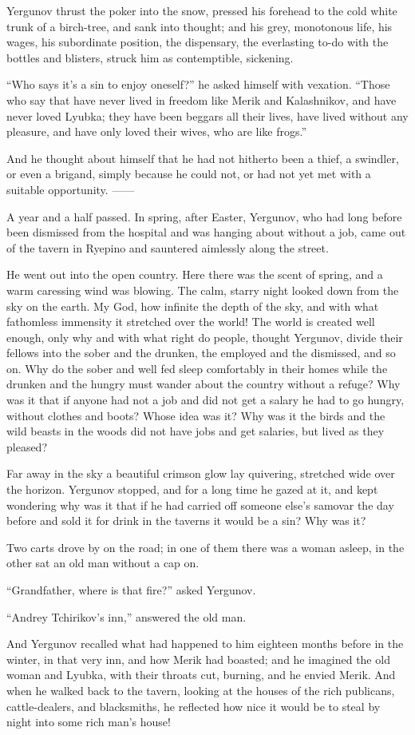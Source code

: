 Yergunov thrust the poker into the snow, pressed his forehead to the
cold white trunk of a birch-tree, and sank into thought; and his grey,
monotonous life, his wages, his subordinate position, the dispensary,
the everlasting to-do with the bottles and blisters, struck him as
contemptible, sickening.

“Who says it’s a sin to enjoy oneself?” he asked himself with vexation.
“Those who say that have never lived in freedom like Merik and
Kalashnikov, and have never loved Lyubka; they have been beggars all
their lives, have lived without any pleasure, and have only loved their
wives, who are like frogs.”

And he thought about himself that he had not hitherto been a thief, a
swindler, or even a brigand, simply because he could not, or had not yet
met with a suitable opportunity. ——

A year and a half passed. In spring, after Easter, Yergunov, who had
long before been dismissed from the hospital and was hanging about
without a job, came out of the tavern in Ryepino and sauntered aimlessly
along the street.

He went out into the open country. Here there was the scent of spring,
and a warm caressing wind was blowing. The calm, starry night looked
down from the sky on the earth. My God, how infinite the depth of the
sky, and with what fathomless immensity it stretched over the world! The
world is created well enough, only why and with what right do people,
thought Yergunov, divide their fellows into the sober and the drunken,
the employed and the dismissed, and so on. Why do the sober and well fed
sleep comfortably in their homes while the drunken and the hungry must
wander about the country without a refuge? Why was it that if anyone had
not a job and did not get a salary he had to go hungry, without clothes
and boots? Whose idea was it? Why was it the birds and the wild beasts
in the woods did not have jobs and get salaries, but lived as they
pleased?

Far away in the sky a beautiful crimson glow lay quivering, stretched
wide over the horizon. Yergunov stopped, and for a long time he gazed at
it, and kept wondering why was it that if he had carried off someone
else’s samovar the day before and sold it for drink in the taverns it
would be a sin? Why was it?

Two carts drove by on the road; in one of them there was a woman asleep,
in the other sat an old man without a cap on.

“Grandfather, where is that fire?” asked Yergunov.

“Andrey Tchirikov’s inn,” answered the old man.

And Yergunov recalled what had happened to him eighteen months before in
the winter, in that very inn, and how Merik had boasted; and he imagined
the old woman and Lyubka, with their throats cut, burning, and he envied
Merik. And when he walked back to the tavern, looking at the houses of
the rich publicans, cattle-dealers, and blacksmiths, he reflected how
nice it would be to steal by night into some rich man’s house!
